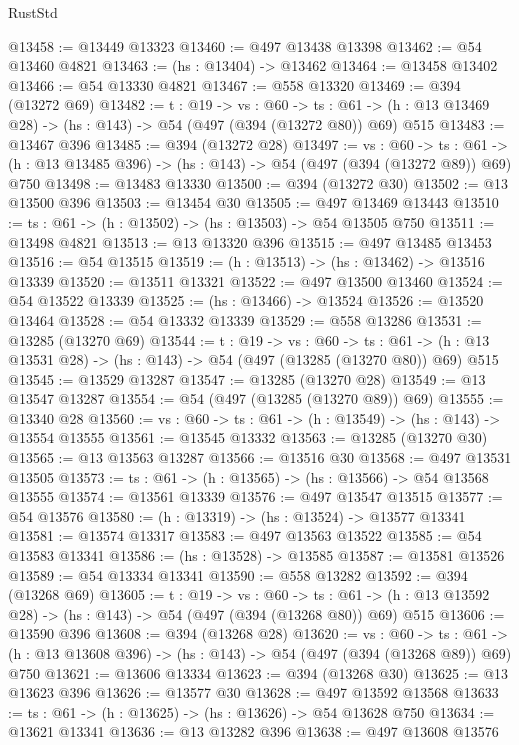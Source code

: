 \begin{lexlean}{RustStd}
\begin{coremodule}
@13458 := @13449 @13323
@13460 := @497 @13438 @13398
@13462 := @54 @13460 @4821
@13463 := (hs : @13404) -> @13462
@13464 := @13458 @13402
@13466 := @54 @13330 @4821
@13467 := @558 @13320
@13469 := @394 (@13272 @69)
@13482 := {t : @19} ->
  {vs : @60} ->
  {ts : @61} -> (h : @13 @13469 @28) -> (hs : @143) -> @54 (@497 (@394 (@13272 @80)) @69) @515
@13483 := @13467 @396
@13485 := @394 (@13272 @28)
@13497 := {vs : @60} ->
  {ts : @61} -> (h : @13 @13485 @396) -> (hs : @143) -> @54 (@497 (@394 (@13272 @89)) @69) @750
@13498 := @13483 @13330
@13500 := @394 (@13272 @30)
@13502 := @13 @13500 @396
@13503 := @13454 @30
@13505 := @497 @13469 @13443
@13510 := {ts : @61} -> (h : @13502) -> (hs : @13503) -> @54 @13505 @750
@13511 := @13498 @4821
@13513 := @13 @13320 @396
@13515 := @497 @13485 @13453
@13516 := @54 @13515
@13519 := (h : @13513) -> (hs : @13462) -> @13516 @13339
@13520 := @13511 @13321
@13522 := @497 @13500 @13460
@13524 := @54 @13522 @13339
@13525 := (hs : @13466) -> @13524
@13526 := @13520 @13464
@13528 := @54 @13332 @13339
@13529 := @558 @13286
@13531 := @13285 (@13270 @69)
@13544 := {t : @19} ->
  {vs : @60} ->
  {ts : @61} -> (h : @13 @13531 @28) -> (hs : @143) -> @54 (@497 (@13285 (@13270 @80)) @69) @515
@13545 := @13529 @13287
@13547 := @13285 (@13270 @28)
@13549 := @13 @13547 @13287
@13554 := @54 (@497 (@13285 (@13270 @89)) @69)
@13555 := @13340 @28
@13560 := {vs : @60} -> {ts : @61} -> (h : @13549) -> (hs : @143) -> @13554 @13555
@13561 := @13545 @13332
@13563 := @13285 (@13270 @30)
@13565 := @13 @13563 @13287
@13566 := @13516 @30
@13568 := @497 @13531 @13505
@13573 := {ts : @61} -> (h : @13565) -> (hs : @13566) -> @54 @13568 @13555
@13574 := @13561 @13339
@13576 := @497 @13547 @13515
@13577 := @54 @13576
@13580 := (h : @13319) -> (hs : @13524) -> @13577 @13341
@13581 := @13574 @13317
@13583 := @497 @13563 @13522
@13585 := @54 @13583 @13341
@13586 := (hs : @13528) -> @13585
@13587 := @13581 @13526
@13589 := @54 @13334 @13341
@13590 := @558 @13282
@13592 := @394 (@13268 @69)
@13605 := {t : @19} ->
  {vs : @60} ->
  {ts : @61} -> (h : @13 @13592 @28) -> (hs : @143) -> @54 (@497 (@394 (@13268 @80)) @69) @515
@13606 := @13590 @396
@13608 := @394 (@13268 @28)
@13620 := {vs : @60} ->
  {ts : @61} -> (h : @13 @13608 @396) -> (hs : @143) -> @54 (@497 (@394 (@13268 @89)) @69) @750
@13621 := @13606 @13334
@13623 := @394 (@13268 @30)
@13625 := @13 @13623 @396
@13626 := @13577 @30
@13628 := @497 @13592 @13568
@13633 := {ts : @61} -> (h : @13625) -> (hs : @13626) -> @54 @13628 @750
@13634 := @13621 @13341
@13636 := @13 @13282 @396
@13638 := @497 @13608 @13576

\end{coremodule}
\end{lexlean}
